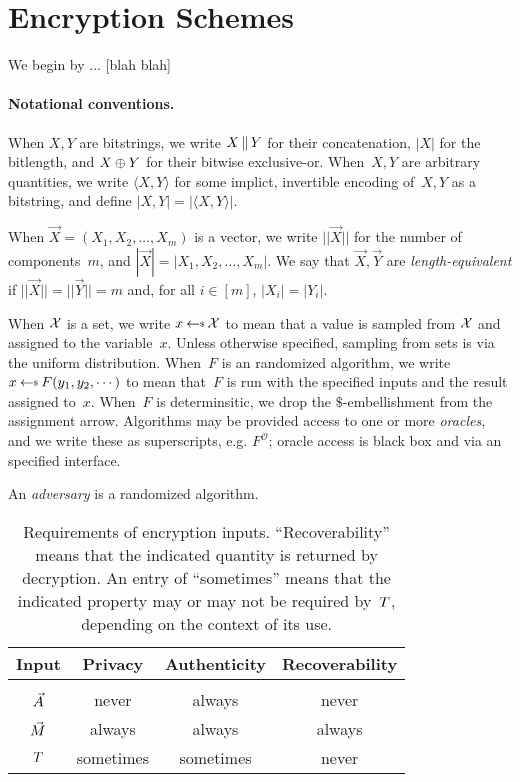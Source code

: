 \newcommand{\dimension}[1]{|| #1 ||}
\section{Encryption Schemes}
\label{sec:prelims}
\label{sec:encryption}
We begin by ... [blah blah]

\paragraph{Notational conventions. }When $X,Y$ are bitstrings, we write $X \,\|\, Y$ for their concatenation, $|X|$ for the bitlength, and $X\oplus Y$ for their bitwise exclusive-or.  When~$X,Y$ are arbitrary quantities, we write $\langle X,Y \rangle$ for some implict, invertible encoding of~$X,Y$ as a bitstring, and define $|X,Y|=|\langle X,Y\rangle|$.

When $\vec{X}=(X_1,X_2,\ldots,X_m)$ is a  vector, we write $\dimension{\vec{X}}$ for the number of components~$m$, and $|\vec{X}|=|X_1,X_2,\ldots,X_m|$.  We say that $\vec{X},\vec{Y}$ are \emph{length-equivalent} if $\dimension{\vec{X}}=\dimension{\vec{Y}}=m$ and, for all $i\in[m]$, $|X_i|=|Y_i|$.

When $\mathcal{X}$ is a set, we write $x \getsr \calX$ to mean that a value is sampled from $\mathcal{X}$ and assigned to the variable~$x$.  Unless otherwise specified, sampling from sets is via the uniform distribution.  
When~$F$ is an randomized algorithm, we write $x \getsr F(y_1,y_2,\cdots)$ to mean that~$F$ is run with the specified inputs and the result assigned to~$x$.  When~$F$ is determinsitic, we drop the $\$$-embellishment from the assignment arrow.  Algorithms may be provided access to one or more \emph{oracles}, and we write these as superscripts, e.g. $F^{\mathcal{O}}$; oracle access is black box and via an specified interface.  

An \emph{adversary} is a randomized algorithm.


\begin{table}[tp]
\centering
\begin{tabular}{c||c|c|c}
Input  & Privacy & Authenticity & Recoverability \\
\hline
&&&\\[-1.5ex]
$\vec{A}$      & never    & always     &  never \\
$\vec{M}$   & always  & always    & always \\ 
$T$    & sometimes    & sometimes  &  never \\ [0.5ex]
\hline
\end{tabular}
\caption{Requirements of encryption inputs. ``Recoverability'' means that the indicated quantity is returned by decryption.  An entry of ``sometimes'' means that the indicated property may or may not be required by~$T$, depending on the context of its use.}
\end{table}


